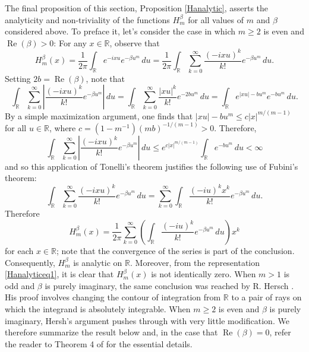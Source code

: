 \documentclass{article}
\theoremstyle{theorem}
\theoremstyle{remark}
\renewcommand\Re{\operatorname{Re}}%
\begin{document}
\noindent The final proposition of this section, Proposition \ref{Hanalytic}, asserts the analyticity and non-triviality of the functions $H_m^{\beta}$ for all values of $m$ and $\beta$ considered above. To preface it, let's consider the case in which $m\geq 2$ is even and $\Re(\beta)>0$: For any $x\in\mathbb{R}$, observe that
\begin{equation*}
H_m^{\beta}(x)=\frac{1}{2\pi}\int_{\mathbb{R}}e^{-ixu}e^{-\beta u^m}\,du=\frac{1}{2\pi}\int_{\mathbb{R}}\sum_{k=0}^{\infty}\frac{(-ixu)^k}{k!}e^{-\beta u^m}\,du.
\end{equation*}
Setting $2b=\Re(\beta)$, note that
\begin{equation*}
\int_{\mathbb{R}}\sum_{k=0}^{\infty}\left|\frac{(-ixu)^k}{k!}e^{-\beta u^m}\right|\,du= \int_{\mathbb{R}}\sum_{k=0}^{\infty}\frac{|xu|^k}{k!}e^{-2b u^m}\,du=\int_{\mathbb{R}}e^{|xu|-bu^m}e^{-bu^m}\,du.
\end{equation*}
By a simple maximization argument, one finds that 
$|xu|-bu^m\leq c |x|^{m/(m-1)}$ for all $u\in\mathbb{R}$, where $c=(1-m^{-1})(mb)^{-1/(m-1)}>0$. Therefore,
\begin{equation*}
\int_{\mathbb{R}}\sum_{k=0}^{\infty}\left|\frac{(-ixu)^k}{k!}e^{-\beta u^m}\right|\,du\leq e^{c|x|^{m/(m-1)}}\int_{\mathbb{R}}e^{-bu^m}\,du<\infty
\end{equation*}
and so this application of Tonelli's theorem justifies the following use of Fubini's theorem:
\begin{equation*}
\int_{\mathbb{R}}\sum_{k=0}^{\infty}\frac{(-ixu)^k}{k!}e^{-\beta u^m}\,du=\sum_{k=0}^{\infty}\int_{\mathbb{R}}\frac{(-iu)^kx^k}{k!}e^{-\beta u^m}\,du.
\end{equation*}
Therefore 
\begin{equation}\label{Hanalyticeq1}
H_m^{\beta}(x)=\frac{1}{2\pi}\sum_{k=0}^{\infty}\left(\int_{\mathbb{R}}\frac{(-iu)^k}{k!}e^{-\beta u^m}\,du\right)x^k
\end{equation}
for each $x\in\mathbb{R}$; note that the convergence of the series is part of the conclusion. Consequently, $H_m^{\beta}$ is analytic on $\mathbb{R}$. Moreover, from the representation \eqref{Hanalyticeq1}, it is clear that $H_m^{\beta}(x)$ is not identically zero. When $m>1$ is odd and $\beta$ is purely imaginary, the same conclusion was reached by R. Hersch \cite{RH}. His proof involves changing the contour of integration from $\mathbb{R}$ to a pair of rays on which the integrand is absolutely integrable. When $m\geq 2$ is even and $\beta$ is purely imaginary, Hersh's argument pushes through with very little modification.  We therefore summarize the result below and, in the case that $\Re(\beta)=0$, refer the reader to Theorem 4 of \cite{RH} for the essential details.
\end{document}
